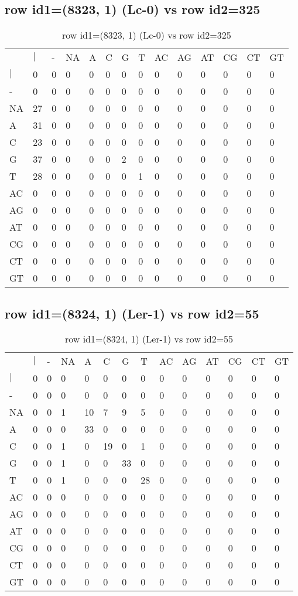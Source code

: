 \subsection{row id1=(8323, 1) (Lc-0) vs row id2=325}
\begin{center}
\begin{longtable}{|l|l|l|l|l|l|l|l|l|l|l|l|l|l|}
\caption{row id1=(8323, 1) (Lc-0) vs row id2=325} \label{table_dm324}\\
\hline
\\
\hline
&$|$&-&NA&A&C&G&T&AC&AG&AT&CG&CT&GT\\
$|$&0&0&0&0&0&0&0&0&0&0&0&0&0\\
-&0&0&0&0&0&0&0&0&0&0&0&0&0\\
NA&27&0&0&0&0&0&0&0&0&0&0&0&0\\
A&31&0&0&0&0&0&0&0&0&0&0&0&0\\
C&23&0&0&0&0&0&0&0&0&0&0&0&0\\
G&37&0&0&0&0&2&0&0&0&0&0&0&0\\
T&28&0&0&0&0&0&1&0&0&0&0&0&0\\
AC&0&0&0&0&0&0&0&0&0&0&0&0&0\\
AG&0&0&0&0&0&0&0&0&0&0&0&0&0\\
AT&0&0&0&0&0&0&0&0&0&0&0&0&0\\
CG&0&0&0&0&0&0&0&0&0&0&0&0&0\\
CT&0&0&0&0&0&0&0&0&0&0&0&0&0\\
GT&0&0&0&0&0&0&0&0&0&0&0&0&0\\
\hline
\end{longtable}
\end{center}

\subsection{row id1=(8324, 1) (Ler-1) vs row id2=55}
\begin{center}
\begin{longtable}{|l|l|l|l|l|l|l|l|l|l|l|l|l|l|}
\caption{row id1=(8324, 1) (Ler-1) vs row id2=55} \label{table_dm326}\\
\hline
\\
\hline
&$|$&-&NA&A&C&G&T&AC&AG&AT&CG&CT&GT\\
$|$&0&0&0&0&0&0&0&0&0&0&0&0&0\\
-&0&0&0&0&0&0&0&0&0&0&0&0&0\\
NA&0&0&1&10&7&9&5&0&0&0&0&0&0\\
A&0&0&0&33&0&0&0&0&0&0&0&0&0\\
C&0&0&1&0&19&0&1&0&0&0&0&0&0\\
G&0&0&1&0&0&33&0&0&0&0&0&0&0\\
T&0&0&1&0&0&0&28&0&0&0&0&0&0\\
AC&0&0&0&0&0&0&0&0&0&0&0&0&0\\
AG&0&0&0&0&0&0&0&0&0&0&0&0&0\\
AT&0&0&0&0&0&0&0&0&0&0&0&0&0\\
CG&0&0&0&0&0&0&0&0&0&0&0&0&0\\
CT&0&0&0&0&0&0&0&0&0&0&0&0&0\\
GT&0&0&0&0&0&0&0&0&0&0&0&0&0\\
\hline
\end{longtable}
\end{center}

